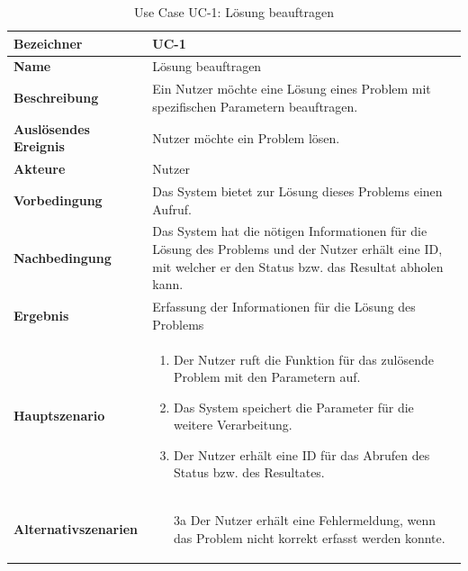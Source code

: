 \begin{table}[ht]
\centering
  \begin{tabular}{ l | p{10cm} }
	\hline
	\rowcolor{gray}
	\textbf{Bezeichner}	&	\textbf{UC-1}\\ \hline
	\textbf{Name}		&	Lösung beauftragen\\ \hline
	\textbf{Beschreibung}	&	Ein Nutzer möchte eine Lösung eines Problem mit spezifischen Parametern beauftragen.\\ \hline
	\textbf{Auslösendes Ereignis} &	Nutzer möchte ein Problem lösen.\\ \hline
	\textbf{Akteure}		&	Nutzer\\ \hline
	\textbf{Vorbedingung}	&	Das System bietet zur Lösung dieses Problems einen Aufruf.\\ \hline
	\textbf{Nachbedingung}	&	Das System hat die nötigen Informationen für die Lösung des Problems und der Nutzer erhält eine ID, mit welcher er den Status bzw. das Resultat 
						abholen kann.\\ \hline
	\textbf{Ergebnis}		&	Erfassung der Informationen für die Lösung des Problems\\ \hline
	\textbf{Hauptszenario}	&	\begin{enumerate}
					\item Der Nutzer ruft die Funktion für das zulösende Problem mit den Parametern auf.
					\item Das System speichert die Parameter für die weitere Verarbeitung.
					\item Der Nutzer erhält eine ID für das Abrufen des Status bzw. des Resultates.
					\end{enumerate}
					\\ \hline
	\textbf{Alternativszenarien}	&	\begin{enumerate}
					\item[3a] Der Nutzer erhält eine Fehlermeldung, wenn das Problem nicht korrekt erfasst werden konnte.
					\end{enumerate}
					\\ \hline
  \end{tabular}
   \caption{Use Case UC-1: Lösung beauftragen}\label{table:use_case_1}
\end{table}

